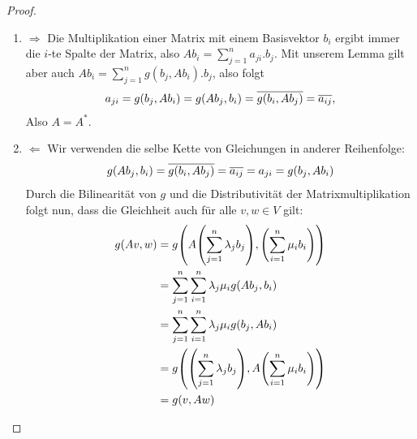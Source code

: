 \documentclass[10pt]{article}
\begin{document}
	\begin{proof}
		\begin{enumerate}
			\item{$\Rightarrow$} Die Multiplikation einer Matrix mit einem Basisvektor $b_i$ ergibt immer die $i$-te Spalte der Matrix, also $Ab_i = \sum_{j = 1}^n a_{ji}.b_j$.
			\newpar
			Mit unserem Lemma gilt aber auch $Ab_i = \sum_{j = 1}^n g(b_j, Ab_i).b_j$, also folgt
			\begin{align*}
				a_{ji} 
				= g(b_j, Ab_i)
				= g(Ab_j, b_i)
				= \overline{{g(b_i, Ab_j)}}
				= \overline{{a_{ij}}},
			\end{align*}
			Also $A = A^*$.
			\item{$\Leftarrow$}
			Wir verwenden die selbe Kette von Gleichungen in anderer Reihenfolge:
			\begin{align*}
				g(Ab_j, b_i)
				= \overline{{g(b_i, Ab_j)}}
				= \overline{{a_{ij}}}
				= a_{ji} 
				= g(b_j, Ab_i)
			\end{align*}
			Durch die Bilinearität von $g$ und die Distributivität der Matrixmultiplikation folgt nun, dass die Gleichheit auch für alle $v,w \in V$ gilt:
			\begin{align*}
				g(Av, w)
				&= g\qty(A\qty(\sum_{j = 1}^n \lambda_j b_j), \qty(\sum_{i = 1}^n \mu_i b_i))\\
				&= \sum_{j = 1}^n \sum_{i = 1}^n \lambda_j \mu_i g\qty(Ab_j, b_i)\\
				&= \sum_{j = 1}^n \sum_{i = 1}^n \lambda_j \mu_i g\qty(b_j, Ab_i)\\
				&= g\qty(\qty(\sum_{j = 1}^n \lambda_j b_j), A\qty(\sum_{i = 1}^n \mu_i b_i))\\
				&= g(v,Aw)
			\end{align*}
		\end{enumerate}
	\end{proof}
\end{document}
